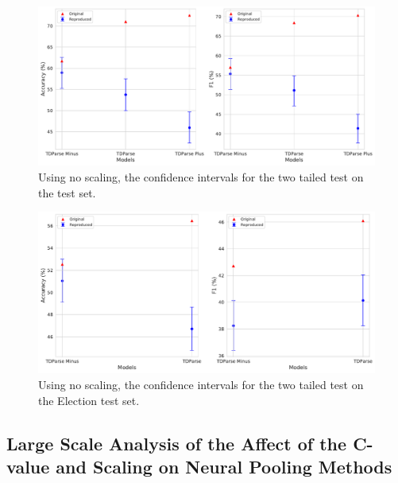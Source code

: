 \begin{figure}[!h]
    \centering
    \includegraphics[scale=0.37]{images/reproducibility/wang/TDParse_no_scale_Dong.pdf}
    \caption{Using no scaling, the confidence intervals for the two tailed test on the \citet{dong-etal-2014-adaptive} test set.}
    \label{fig:repro_wang_TDParse_Dong_no_scale}
\end{figure}
\begin{figure}[!h]
    \centering
    \includegraphics[scale=0.37]{images/reproducibility/wang/TDParse_no_scale_Election.pdf}
    \caption{Using no scaling, the confidence intervals for the two tailed test on the \citet{wang-etal-2017-tdparse} Election test set.}
    \label{fig:repro_wang_TDParse_Election_no_scale}
\end{figure}

\FloatBarrier
\subsection{Large Scale Analysis of the Affect of the C-value and Scaling on Neural Pooling Methods}

